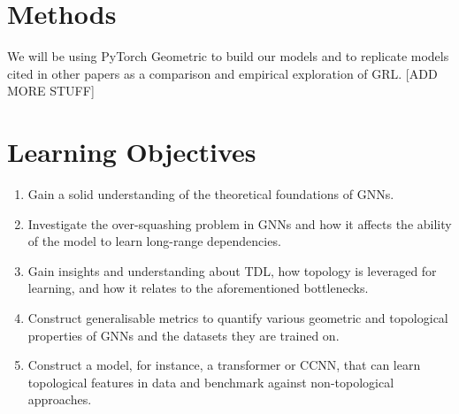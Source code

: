 \documentclass[a4paper,12pt]{article}
\begin{document}
\section{Methods}
We will be using PyTorch Geometric to build our models and to replicate models cited in other papers as a comparison and empirical exploration of GRL.
	[ADD MORE STUFF]

\section{Learning Objectives}


\begin{enumerate}
	\item Gain a solid understanding of the theoretical foundations of GNNs.
	\item Investigate the over-squashing problem in GNNs and how it affects the ability of the model to learn long-range dependencies\cite{alon_bottleneck_2021}.
	\item Gain insights and understanding about TDL, how topology is leveraged for learning, and how it relates to the aforementioned bottlenecks\cite{horn_topological_2022}.
	\item Construct generalisable metrics to quantify various geometric and topological properties of GNNs and the datasets they are trained on.
	\item Construct a model, for instance, a transformer or CCNN\cite{tdlbook}, that can learn topological features in data and benchmark against non-topological approaches.
\end{enumerate}

\printbibliography
\end{document}
